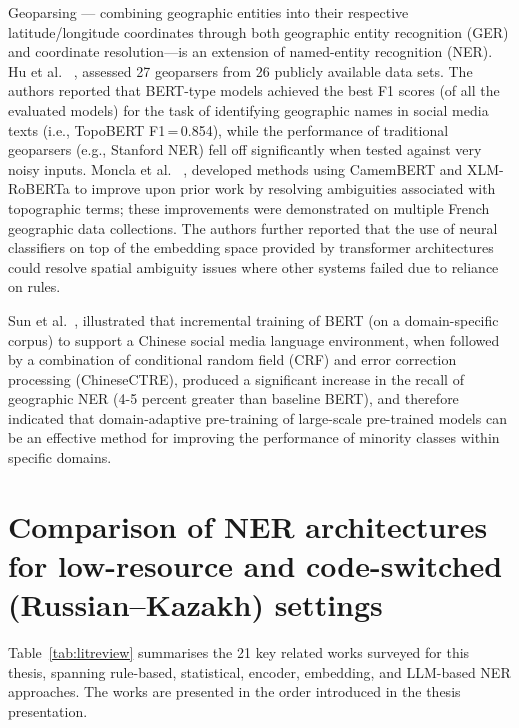 Geoparsing --- combining geographic entities into their respective latitude/longitude coordinates through both geographic entity recognition (GER) and coordinate resolution—is an extension of named-entity recognition (NER). Hu et al. ~\cite{hu2023geoparsing}, assessed 27 geoparsers from 26 publicly available data sets. The authors reported that BERT-type models achieved the best F1 scores (of all the evaluated models) for the task of identifying geographic names in social media texts (i.e., TopoBERT F1\,=\,0.854), while the performance of traditional geoparsers (e.g., Stanford NER) fell off significantly when tested against very noisy inputs. Moncla et al. ~\cite{moncla2022toponyms}, developed methods using CamemBERT and XLM-RoBERTa to improve upon prior work by resolving ambiguities associated with topographic terms; these improvements were demonstrated on multiple French geographic data collections. The authors further reported that the use of neural classifiers on top of the embedding space provided by transformer architectures could resolve spatial ambiguity issues where other systems failed due to reliance on rules. 

Sun et al.~\cite{sun2023chinesectre}, illustrated that incremental training of BERT (on a domain-specific corpus) to support a Chinese social media language environment, when followed by a combination of conditional random field (CRF) and error correction processing (ChineseCTRE), produced a significant increase in the recall of geographic NER (4-5 percent greater than baseline BERT), and therefore indicated that domain-adaptive pre-training of large-scale pre-trained models can be an effective method for improving the performance of minority classes within specific domains.

\section{Comparison of NER architectures for low-resource and code-switched (Russian--Kazakh) settings}
\label{sec:arch_comparison}

Table~\ref{tab:litreview} summarises the 21 key related works surveyed for this thesis, spanning rule-based, statistical, encoder, embedding, and LLM-based NER approaches. The works are presented in the order introduced in the thesis presentation.

